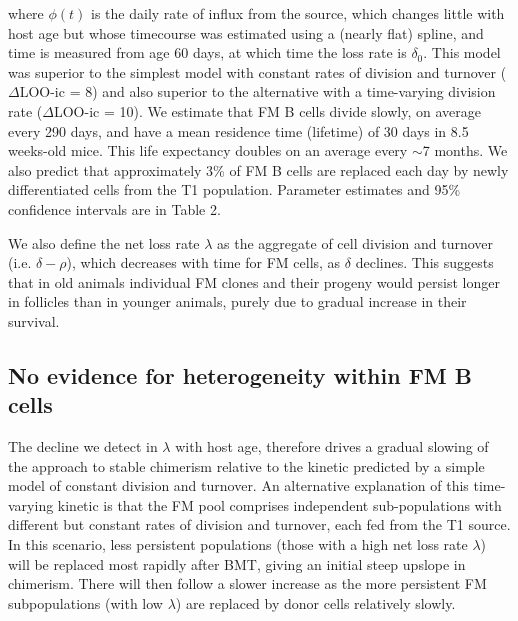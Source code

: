\documentclass[11pt]{article}
\begin{document}
	where $\phi(t)$ is the daily rate of influx from the source, which changes little with host age but whose timecourse was estimated using a (nearly flat) spline, and time is measured from age 60 days, at which time the loss rate is $\delta_{0}$. This model was superior to the simplest model with constant rates of division and turnover ($\Delta$LOO-ic = 8) and also superior to the alternative with a time-varying division rate ($\Delta$LOO-ic = 10). We estimate that FM B cells divide slowly, on average every 290 days,  and have a mean residence time (lifetime) of 30 days in 8.5 weeks-old mice. This life expectancy doubles on an average every $\sim$7 months. We also predict that approximately 3\% of FM B cells are replaced each day by newly differentiated cells from the T1 population. Parameter estimates and 95\% confidence intervals are in Table 2.
	
	We also define the net loss rate $\lambda$ as the aggregate of cell division and turnover (i.e. $\delta - \rho$), which decreases with time for FM cells, as $\delta$ declines.
	This suggests that in old animals individual FM clones and their progeny would persist longer in follicles than in younger animals, purely due to gradual increase in their survival.
	
\subsection*{No evidence for  heterogeneity within FM B cells}
	
	The decline we detect in $\lambda$ with host age, %
	therefore drives a gradual slowing of the approach to stable chimerism relative to the kinetic predicted by a simple model of constant division and turnover. An alternative explanation of this time-varying kinetic is that the FM pool comprises independent sub-populations with different but constant rates of division and turnover, each fed from the T1 source.  In this scenario, less persistent populations (those with a high net loss rate $\lambda$) will be replaced most rapidly after BMT, giving an initial steep upslope in chimerism. There will then follow a slower increase as the more persistent FM subpopulations (with low $\lambda$) are replaced by donor cells relatively slowly.
	
\end{document}
